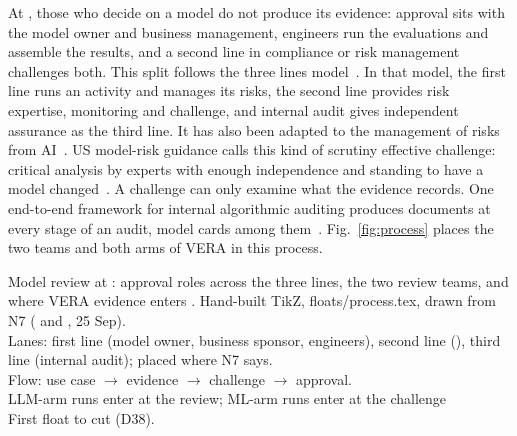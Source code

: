 
At \bankname{}, those who decide on a model do not produce its evidence: approval sits with the model owner and business management, engineers run the evaluations and assemble the results, and a second line in compliance or risk management challenges both.
This split follows the three lines model~\cite{iia2020three}.
In that model, the first line runs an activity and manages its risks, the second line provides risk expertise, monitoring and challenge, and internal audit gives independent assurance as the third line.
It has also been adapted to the management of risks from AI~\cite{schuett2025three}.
US model-risk guidance calls this kind of scrutiny effective challenge: critical analysis by experts with enough independence and standing to have a model changed~\cite{federalreserve2011sr117,federalreserve2026sr262}.
A challenge can only examine what the evidence records.
One end-to-end framework for internal algorithmic auditing produces documents at every stage of an audit, model cards among them~\cite{raji2020closing,mitchell2019modelcard}.
Fig.~\ref{fig:process} places the two teams and both arms of VERA in this process.

%
  {Model review at \bankname{}: approval roles across the three lines, the two review teams, and where VERA evidence enters .}%
  {Hand-built TikZ, floats/process.tex, drawn from N7 (\aicc{} and \legalrisk{}, 25 Sep).\\
   Lanes: first line (model owner, business sponsor, engineers), second line (\legalrisk{}), third line (internal audit); \aicc{} placed where N7 says.\\
   Flow: use case $\rightarrow$ evidence $\rightarrow$ challenge $\rightarrow$ approval.\\
   LLM-arm runs enter at the \aicc{} review; ML-arm runs enter at the \legalrisk{} challenge\\
   First float to cut (D38).}

